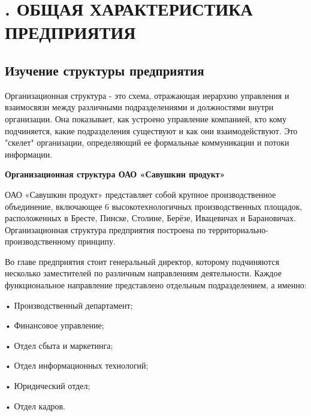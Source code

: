 \sectionbreak \section*{
  \gostTitleFont
  . ОБЩАЯ ХАРАКТЕРИСТИКА ПРЕДПРИЯТИЯ
}

\titlespace

\subsection*{ 
  \gostTitleFont
   Изучение структуры предприятия
} 

\subtitlespace

{\gostFont

  \par \redline Организационная структура - это схема, отражающая иерархию управления и взаимосвязи между различными подразделениями и должностями внутри организации. Она показывает, как устроено управление компанией, кто кому подчиняется, какие подразделения существуют и как они взаимодействуют. Это "скелет" организации, определяющий ее формальные коммуникации и потоки информации.

  \par \redline \textbf{Организационная структура ОАО «Савушкин продукт»}

  \par \redline ОАО «Савушкин продукт» представляет собой крупное производственное объединение, включающее 6 высокотехнологичных производственных площадок, расположенных в Бресте, Пинске, Столине, Берёзе, Ивацевичах и Барановичах. Организационная структура предприятия построена по территориально-производственному принципу.

  \par \redline Во главе предприятия стоит генеральный директор, которому подчиняются несколько заместителей по различным направлениям деятельности. Каждое функциональное направление представлено отдельным подразделением, а именно:
  
  \par \redline • Производственный департамент;
  \par \redline • Финансовое управление;
  \par \redline • Отдел сбыта и маркетинга;
  \par \redline • Отдел информационных технологий;
  \par \redline • Юридический отдел;
  \par \redline • Отдел кадров.

}

